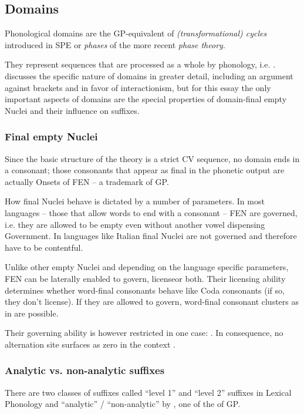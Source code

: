 \subsection{Domains}
\label{subsec:intro:domains}

Phonological domains are the \gls{GP}-equivalent of
\emph{(transformational) cycles} introduced in SPE \parencite{chomsky1968}
or \emph{phases} of the more recent \emph{phase theory}.

They represent sequences that are processed as a whole by phonology, i.e.
.
\Textcite{scheer2012} discusses the specific nature of domains in greater
detail, including an argument against brackets and in favor of
interactionism, but for this essay the only important aspects of
domains are the special properties of domain-final empty Nuclei and
their influence on suffixes.


\subsubsection{Final empty Nuclei}
Since the basic structure of the theory is a strict CV sequence,
no domain ends in a consonant; those consonants that appear as final
in the phonetic output are actually Onsets of \gls{FEN}
-- a trademark of \gls{GP}.

How final Nuclei behave is dictated by a number of parameters.
In most languages -- those that allow words to end with a consonant --
\gls{FEN} are governed, i.e. they are allowed to be empty even without
another vowel dispensing Government.
In languages like Italian final Nuclei are not governed and therefore
have to be contentful.

Unlike other empty Nuclei and depending on the language specific parameters,
\gls{FEN} can be laterally enabled to govern, license\co or both.
Their licensing ability determines whether word-final consonants behave
like Coda consonants (if so, they don't license).
If they are allowed to govern, word-final consonant clusters as in 
are possible. \parencite[appendix~1]{scheer2004}

Their governing ability is however restricted in one case:
.
In consequence, no alternation site surfaces as zero in the context
.


\subsubsection{Analytic vs. non-analytic suffixes}
There are two classes of suffixes called \enquote{level 1} and
\enquote{level 2} suffixes in Lexical Phonology and
\enquote{analytic} / \enquote{non-analytic} by ,
one of the  of \gls{GP}.

